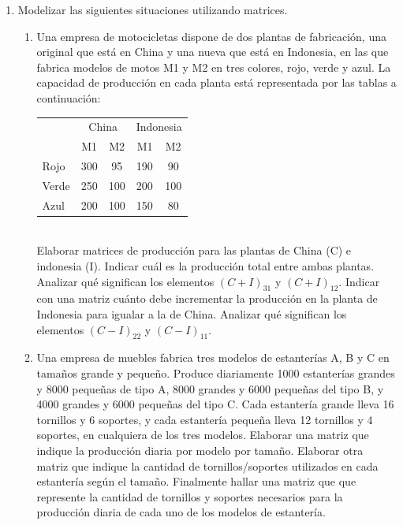 \documentclass[a4paper]{article}
\newcommand{\exercise}{\item}
\begin{document}
\begin{enumerate}
	\exercise Modelizar las siguientes situaciones utilizando matrices.
	\begin{enumerate} [label=(\alph*)]
		\item Una empresa de motocicletas dispone de dos plantas de fabricación, una original que está en China y una nueva que está en Indonesia, en las que fabrica modelos de motos M1 y M2 en tres colores, rojo, verde y azul. La capacidad de producción en cada planta está representada por las tablas a continuación: \\ \vspace{-5mm} \begin{center}\begin{tabular}{l|cc|cc|} \cline{2-5}  & \multicolumn{2}{c|}{China} & \multicolumn{2}{c|}{Indonesia} \\ \cline{2-5} & \multicolumn{1}{c|}{M1}  & \multicolumn{1}{c|}{M2} & \multicolumn{1}{c|}{M1}  & \multicolumn{1}{c|}{M2} \\ \hline \multicolumn{1}{|l|}{Rojo}  & \multicolumn{1}{l|}{300} & 95 & \multicolumn{1}{l|}{190} & 90 \\ \hline  \multicolumn{1}{|l|}{Verde} & \multicolumn{1}{l|}{250} & 100 & \multicolumn{1}{l|}{200} & 100 \\ \hline \multicolumn{1}{|l|}{Azul}  & \multicolumn{1}{l|}{200} & 100 & \multicolumn{1}{l|}{150} & 80  \\ \hline \end{tabular} \end{center} \\ Elaborar matrices de producción para las plantas de China (C) e indonesia (I). Indicar cuál es la producción total entre ambas plantas. Analizar qué significan los elementos $(C+I)_{31}$ y $(C+I)_{12}$. Indicar con una matriz cuánto debe incrementar la producción en la planta de Indonesia para igualar a la de China. Analizar qué significan los elementos $(C-I)_{22}$ y $(C-I)_{11}$. 
		\item Una empresa de muebles fabrica tres modelos de estanterías A, B y C en tamaños grande y pequeño. Produce diariamente 1000 estanterías grandes y 8000 pequeñas de tipo A, 8000 grandes y 6000 pequeñas del tipo B, y 4000 grandes y 6000 pequeñas del tipo C. Cada estantería grande lleva 16 tornillos y 6 soportes, y cada estantería pequeña lleva 12 tornillos y 4 soportes, en cualquiera de los tres modelos. Elaborar una matriz que indique la producción diaria por modelo por tamaño. Elaborar otra matriz que indique la cantidad de tornillos/soportes utilizados en cada estantería según el tamaño. Finalmente hallar una matriz que que represente la cantidad de tornillos y soportes necesarios para la producción diaria de cada uno de los modelos de estantería. 

\end{enumerate}
\end{enumerate}
\end{document}
